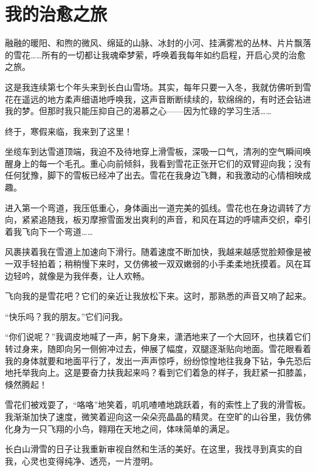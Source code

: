 
\section*{我的治愈之旅}

融融的暖阳、和煦的微风、绵延的山脉、冰封的小河、挂满雾凇的丛林、片片飘落的雪花……所有的一切都让我魂牵梦萦，呼唤着我每年如约启程，开启心灵的治愈之旅。

这是我连续第七个年头来到长白山雪场。其实，每年只要一入冬，我就仿佛听到雪花在遥远的地方柔声细语地呼唤我，这声音断断续续的，软绵绵的，有时还会钻进我的梦。但那时我只能压抑自己的渴慕之心——因为忙碌的学习生活……

终于，寒假来临，我来到了这里！

坐缆车到达雪道顶端，我迫不及待地穿上滑雪板，深吸一口气，清冽的空气瞬间唤醒身上的每一个毛孔。重心向前倾斜，我看到雪花正张开它们的双臂迎向我；没有任何犹豫，脚下的雪板已经冲了出去。雪花在我身边飞舞，和我激动的心情相映成趣。

进入第一个弯道，我压低重心，身体画出一道完美的弧线。雪花也在身边调转了方向，紧紧追随我，板刃摩擦雪面发出爽利的声音，和风在耳边的呼啸声交织，牵引着我飞向下一个弯道……

风裹挟着我在雪道上加速向下滑行。随着速度不断加快，我越来越感觉脸颊像是被一双手轻拍着；稍稍慢下来时，又仿佛被一双双嫩弱的小手柔柔地抚摸着。风在耳边轻吟，就像是为我伴奏，让人欢畅。

飞向我的是雪花吧？它们的亲近让我放松下来。这时，那熟悉的声音又响了起来。

“快乐吗？我的朋友。”它们问我。

“你们说呢？”我调皮地喊了一声，躬下身来，潇洒地来了一个大回环，也挟着它们转过身来，随即向另一侧俯冲过去，伸展了幅度，双腿逐渐贴向地面。雪花眼看着我的身体就要和地面平行了，发出一声声惊呼，纷纷惊惶地往我身下钻，争先恐后地托举我向上。这是要奋力扶我起来吗？看到它们着急的样子，我赶紧一扣膝盖，倏然腾起！

雪花们被戏耍了，“咯咯”地笑着，叽叽喳喳地跳跃着，有的索性上了我的滑雪板。我渐渐加快了速度，微笑着迎向这一朵朵亮晶晶的精灵。在空旷的山谷里，我仿佛化身为一只飞翔的小鸟，翱翔在天地之间，体味简单的满足。

长白山滑雪的日子让我重新审视自然和生活的美好。在这里，我找寻到真实的自我，心灵也变得纯净、透亮，一片澄明。


